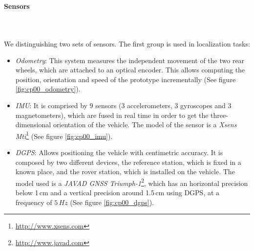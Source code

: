 \paragraph{Sensors}\label{ch:chapter00_03_00_00_02}

~\\~\\We distinguishing two sets of sensors. The first group is used in localization tasks:

\begin{itemize}
 \item \emph{Odometry}: This system measures the independent movement of the two rear wheels, which are attached to an optical encoder. This allows computing the position, orientation and speed of the prototype incrementally (See figure \ref{fig:cp00_odometry}).
 \item \emph{\acf{IMU}}: It is comprised by 9 sensors (3 accelerometers, 3 gyroscopes and 3 magnetometers), which are fused in real time in order to get the three-dimensional orientation of the vehicle. The model of the sensor is a \emph{Xsens Mti}\footnote{\url{http://www.xsens.com}} (See figure \ref{fig:cp00_imu}).
 \item \emph{\acf{DGPS}}: Allows positioning the vehicle with centimetric accuracy. It is composed by two different devices, the reference station, which is fixed in a known place, and the rover station, which is installed on the vehicle. The model used is a \emph{JAVAD GNSS Triumph-1}\footnote{\url{http://www.javad.com}}, which has an horizontal precision below 1\,cm and a vertical precision around 1.5\,cm using \ac{DGPS}, at a frequency of $5\,Hz$ (See figure \ref{fig:cp00_dgps}).
\end{itemize}

